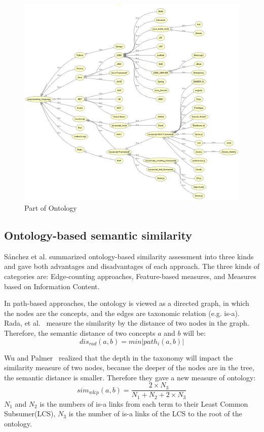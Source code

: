 \begin{figure}[htbp]
  \includegraphics[scale=0.4]{images/ontology_pro.png}
  \caption{Part of Ontology}
  \label{fig:ontology_pro}
\end{figure}

\subsection{Ontology-based semantic similarity}

S{\'a}nchez et al. \cite{sanchez2012ontology} summarized ontology-based similarity assessment into three kinds and gave both advantages and disadvantages of each approach. The three kinds of categories are: Edge-counting approaches, Feature-based measures, and Measures based on Information Content.



In path-based approaches, the ontology is viewed as a directed graph, in which the nodes are the concepts, and the edges are taxonomic relation (e.g. is-a). Rada, et al.~\cite{rada1989development} measure the similarity by the distance of two nodes in the graph. Therefore, the semantic distance of two concepts $a$ and $b$ will be:
$$ dis_{rad}(a,b) = min |path_i(a,b)| $$

Wu and Palmer~\cite{wu1994verbs} realized that the depth in the taxonomy will impact the similarity measure of two nodes, because the deeper of the nodes are in the tree, the semantic distance is smaller. Therefore they gave a new measure of ontology:
$$ sim_{w\&p}(a,b) = \frac{2 \times N_3}{N_1 + N_2 + 2 \times N_3} $$
$N_1$ and $N_2$ is the numbers of is-a links from each term to their Least Common Subsumer(LCS), $N_3$ is the number of is-a links of the LCS to the root of the ontology.

